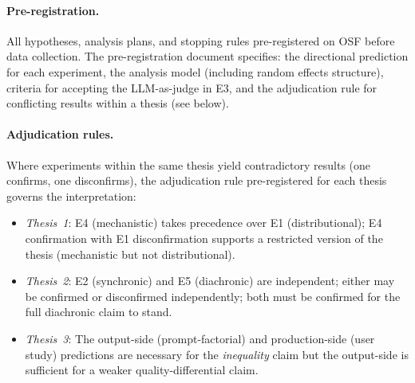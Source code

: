 \documentclass[12pt,a4paper]{article}
\begin{document}
\paragraph{Pre-registration.} All hypotheses, analysis plans, and stopping
rules pre-registered on OSF before data collection. The pre-registration
document specifies: the directional prediction for each experiment, the
analysis model (including random effects structure), criteria for accepting
the LLM-as-judge in E3, and the adjudication rule for conflicting results
within a thesis (see below).

\paragraph{Adjudication rules.} Where experiments within the same thesis
yield contradictory results (one confirms, one disconfirms), the adjudication
rule pre-registered for each thesis governs the interpretation:
\begin{itemize}
\item \emph{Thesis~1}: E4 (mechanistic) takes precedence over E1
      (distributional); E4 confirmation with E1 disconfirmation supports a
      restricted version of the thesis (mechanistic but not distributional).
\item \emph{Thesis~2}: E2 (synchronic) and E5 (diachronic) are independent;
      either may be confirmed or disconfirmed independently; both must be
      confirmed for the full diachronic claim to stand.
\item \emph{Thesis~3}: The output-side (prompt-factorial) and production-side
      (user study) predictions are necessary for the \emph{inequality} claim
      but the output-side is sufficient for a weaker quality-differential claim.
\end{itemize}
\end{document}
